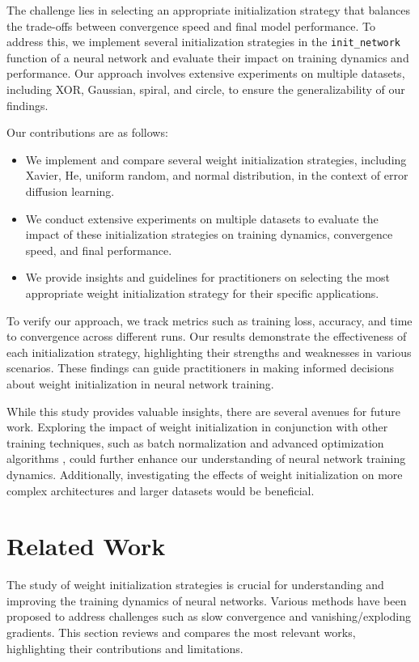 \documentclass{article} %
\begin{document}
The challenge lies in selecting an appropriate initialization strategy that balances the trade-offs between convergence speed and final model performance. To address this, we implement several initialization strategies in the \texttt{init\_network} function of a neural network and evaluate their impact on training dynamics and performance. Our approach involves extensive experiments on multiple datasets, including XOR, Gaussian, spiral, and circle, to ensure the generalizability of our findings.

Our contributions are as follows:
\begin{itemize}
    \item We implement and compare several weight initialization strategies, including Xavier, He, uniform random, and normal distribution, in the context of error diffusion learning.
    \item We conduct extensive experiments on multiple datasets to evaluate the impact of these initialization strategies on training dynamics, convergence speed, and final performance.
    \item We provide insights and guidelines for practitioners on selecting the most appropriate weight initialization strategy for their specific applications.
\end{itemize}

To verify our approach, we track metrics such as training loss, accuracy, and time to convergence across different runs. Our results demonstrate the effectiveness of each initialization strategy, highlighting their strengths and weaknesses in various scenarios. These findings can guide practitioners in making informed decisions about weight initialization in neural network training.

While this study provides valuable insights, there are several avenues for future work. Exploring the impact of weight initialization in conjunction with other training techniques, such as batch normalization \citep{ba2016layer} and advanced optimization algorithms \citep{loshchilov2017adamw}, could further enhance our understanding of neural network training dynamics. Additionally, investigating the effects of weight initialization on more complex architectures and larger datasets would be beneficial.

\section{Related Work}
\label{sec:related}

The study of weight initialization strategies is crucial for understanding and improving the training dynamics of neural networks. Various methods have been proposed to address challenges such as slow convergence and vanishing/exploding gradients. This section reviews and compares the most relevant works, highlighting their contributions and limitations.
\end{document}
